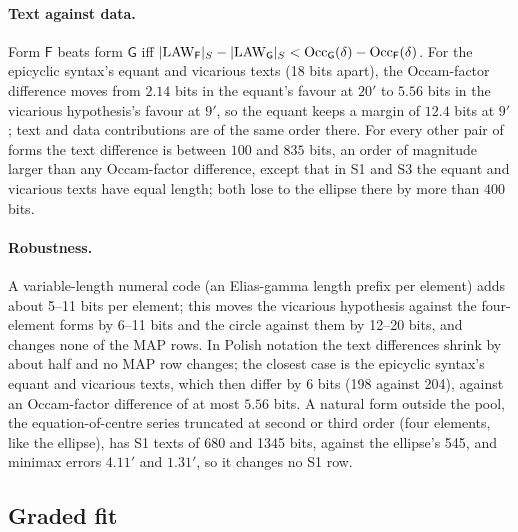 \paragraph{Text against data.} Form $\mathsf F$ beats form $\mathsf G$ iff $\lvert\mathrm{LAW}_{\mathsf F}\rvert_S-\lvert\mathrm{LAW}_{\mathsf G}\rvert_S<\mathrm{Occ}_{\mathsf G}(\delta)-\mathrm{Occ}_{\mathsf F}(\delta)$. For the epicyclic syntax's equant and vicarious texts (18 bits apart), the Occam-factor difference moves from $2.14$ bits in the equant's favour at $20'$ to $5.56$ bits in the vicarious hypothesis's favour at $9'$, so the equant keeps a margin of $12.4$ bits at $9'$; text and data contributions are of the same order there. For every other pair of forms the text difference is between $100$ and $835$ bits, an order of magnitude larger than any Occam-factor difference, except that in S1 and S3 the equant and vicarious texts have equal length; both lose to the ellipse there by more than $400$ bits.

\paragraph{Robustness.} A variable-length numeral code (an Elias-gamma length prefix per element) adds about 5--11 bits per element; this moves the vicarious hypothesis against the four-element forms by 6--11 bits and the circle against them by 12--20 bits, and changes none of the MAP rows. In Polish notation the text differences shrink by about half and no MAP row changes; the closest case is the epicyclic syntax's equant and vicarious texts, which then differ by 6 bits (198 against 204), against an Occam-factor difference of at most $5.56$ bits. A natural form outside the pool, the equation-of-centre series truncated at second or third order (four elements, like the ellipse), has S1 texts of 680 and 1345 bits, against the ellipse's 545, and minimax errors $4.11'$ and $1.31'$, so it changes no S1 row.

\subsection{Graded fit}\label{sec:kepler:gradeddetails}

